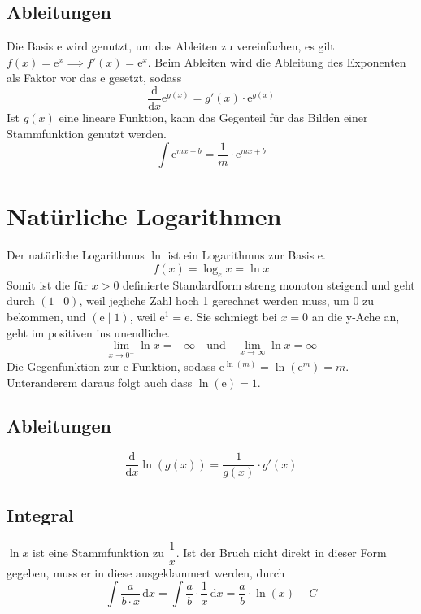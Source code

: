 \documentclass{article}
\begin{document}
\subsection{Ableitungen} 
Die Basis $\mathrm{e}$ wird genutzt, um das Ableiten zu vereinfachen, es gilt $f(x)=\mathrm{e}^x \implies f'(x)=\mathrm{e}^x$. \newline
Beim Ableiten wird die Ableitung des Exponenten als Faktor vor das $\mathrm{e}$ gesetzt, sodass 
\[
 \frac{\mathrm{d}}{\mathrm{d}x} \mathrm{e}^{g(x)} = g'(x) \cdot \mathrm{e}^{g(x)} 
\] 
Ist $g(x)$ eine lineare Funktion, kann das Gegenteil für das Bilden einer Stammfunktion genutzt werden. 
\[
 \int \mathrm{e}^{mx+b} = \frac{1}{m} \cdot \mathrm{e}^{mx+b}
\] 
\section{Natürliche Logarithmen} 
\begin{minipage}{\dimexpr\textwidth-5cm}  
Der natürliche Logarithmus $\ln$ ist ein Logarithmus zur Basis $\mathrm{e}$.
\[
 f(x) = \log_e{x} = \ln{x}
\] 
Somit ist die für $x>0$ definierte Standardform streng monoton steigend und geht durch ${(1 \mid 0)}$, weil jegliche Zahl hoch 1 gerechnet werden muss, um 0 zu bekommen, und $(\mathrm{e} \mid 1)$, weil $\mathrm{e}^1=\mathrm{e}$. \newline
Sie schmiegt bei $x=0$ an die y-Ache an, geht im positiven ins unendliche.
\[
 \lim_{x \to 0^+} \ln x = -\infty
 \quad \text{und} \quad
 \lim_{x \to \infty} \ln x= \infty
\] 
Die Gegenfunktion zur e-Funktion, sodass $\mathrm{e}^{\ln(m)}=\ln{(\mathrm{e}^m)}=m$. Unteranderem daraus folgt auch dass $\ln(\mathrm{e})=1$.
 
\end{minipage}
\hfill
\begin{minipage}{5cm}  
\centering
\end{minipage}
 
\subsection{Ableitungen} 
\[
 \frac{\mathrm{d}}{\mathrm{d}x} \ln{(g(x))} = \frac{1}{g(x)} \cdot g'(x) 
\] 
\subsection{Integral}
$\ln{x}$ ist eine Stammfunktion zu $\dfrac{1}{x}$. Ist der Bruch nicht direkt in dieser Form gegeben, muss er in diese ausgeklammert werden, durch
\[
 \int \frac{a}{b \cdot x} \,\mathrm{d}x =
 \int \frac{a}{b} \cdot \frac{1}{x} \,\mathrm{d}x =
 \frac{a}{b} \cdot \ln(x) + C
\] 
 
\end{document}
